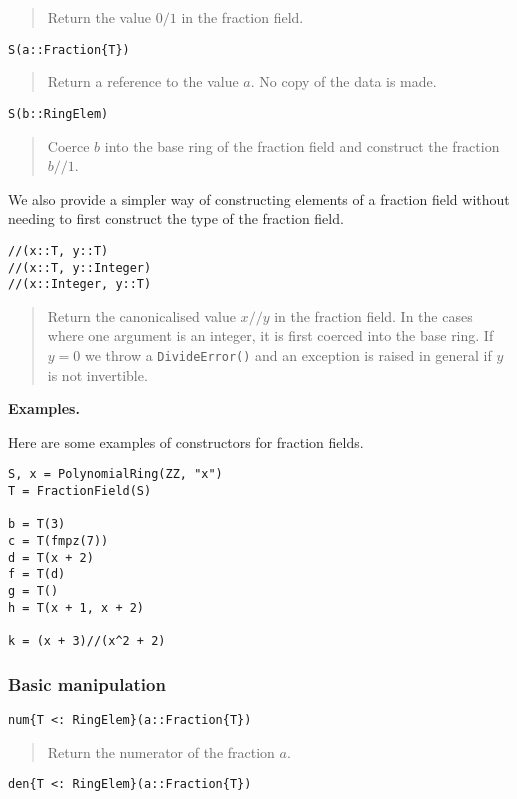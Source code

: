 \documentclass[a4paper,10pt]{article}
\newcommand{\code}{\lstinline}
\newcommand{\desc}[1]{\vspace{-3mm}\begin{quote}#1\end{quote}}
\begin{document}
\desc{Return the value $0/1$ in the fraction field.}

\begin{lstlisting}
S(a::Fraction{T})
\end{lstlisting}

\desc{Return a reference to the value $a$. No copy of the data is made.}

\begin{lstlisting}
S(b::RingElem)
\end{lstlisting}

\desc{Coerce $b$ into the base ring of the fraction field and construct the
fraction $b//1$.}

We also provide a simpler way of constructing elements of a fraction field
without needing to first construct the type of the fraction field. 

\begin{lstlisting}
//(x::T, y::T)
//(x::T, y::Integer)
//(x::Integer, y::T)
\end{lstlisting}

\desc{Return the canonicalised value $x//y$ in the fraction field. In the cases
where one argument is an integer, it is first coerced into the base ring. If
$y = 0$ we throw a \code{DivideError()} and an exception is raised in general
if $y$ is not invertible.}

\textbf{Examples.}

Here are some examples of constructors for fraction fields.

\begin{lstlisting}
S, x = PolynomialRing(ZZ, "x")
T = FractionField(S)

b = T(3)
c = T(fmpz(7))
d = T(x + 2)
f = T(d)
g = T()
h = T(x + 1, x + 2)

k = (x + 3)//(x^2 + 2)
\end{lstlisting}

\subsubsection{Basic manipulation}

\begin{lstlisting}
num{T <: RingElem}(a::Fraction{T})
\end{lstlisting}

\desc{Return the numerator of the fraction $a$.}

\begin{lstlisting}
den{T <: RingElem}(a::Fraction{T})
\end{lstlisting}
\end{document}
